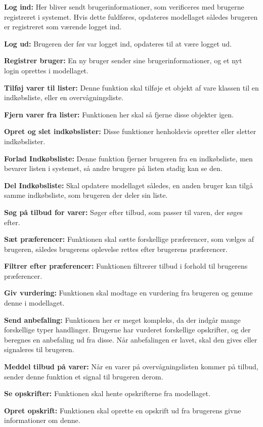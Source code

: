 \textbf{Log ind:} Her bliver sendt brugerinformationer, som verificeres med brugerne registreret i systemet.
Hvis dette fuldføres, opdateres modellaget således brugeren er registreret som værende logget ind.

\textbf{Log ud:} Brugeren der før var logget ind, opdateres til at være logget ud.

\textbf{Registrer bruger:} En ny bruger sender sine brugerinformationer, og et nyt login oprettes i modellaget.

\textbf{Tilføj varer til lister:} Denne funktion skal tilføje et objekt af vare klassen til en indkøbsliste, eller en overvågningsliste.

\textbf{Fjern varer fra lister:} Funktionen her skal så fjerne disse objekter igen.

\textbf{Opret og slet indkøbslister:} Disse funktioner henholdsvis opretter eller sletter indkøbslister.

\textbf{Forlad Indkøbsliste:} Denne funktion fjerner brugeren fra en indkøbsliste, men bevarer listen i systemet, så andre brugere på listen stadig kan se den.

\textbf{Del Indkøbsliste:} Skal opdatere modellaget således, en anden bruger kan tilgå samme indkøbsliste, som brugeren der deler sin liste.

\textbf{Søg på tilbud for varer:} Søger efter tilbud, som passer til varen, der søges efter.

\textbf{Sæt præferencer:} Funktionen skal sætte forskellige præferencer, som vælges af brugeren, således brugerens oplevelse rettes efter brugerens præferencer.

\textbf{Filtrer efter præferencer:} Funktionen filtrerer tilbud i forhold til brugerens præferencer.

\textbf{Giv vurdering:} Funktionen skal modtage en vurdering fra brugeren og gemme denne i modellaget.

\textbf{Send anbefaling:} Funktionen her er meget kompleks, da der indgår mange forskellige typer handlinger.
Brugerne har vurderet forskellige opskrifter, og der beregnes en anbefaling ud fra disse.
Når anbefalingen er lavet, skal den gives eller signaleres til brugeren.

\textbf{Meddel tilbud på varer:} Når en varer på overvågningslisten kommer på tilbud, sender denne funktion et signal til brugeren derom.

\textbf{Se opskrifter:} Funktionen skal hente opskrifterne fra modellaget.

\textbf{Opret opskrift:} Funktionen skal oprette en opskrift ud fra brugerens givne informationer om denne.

